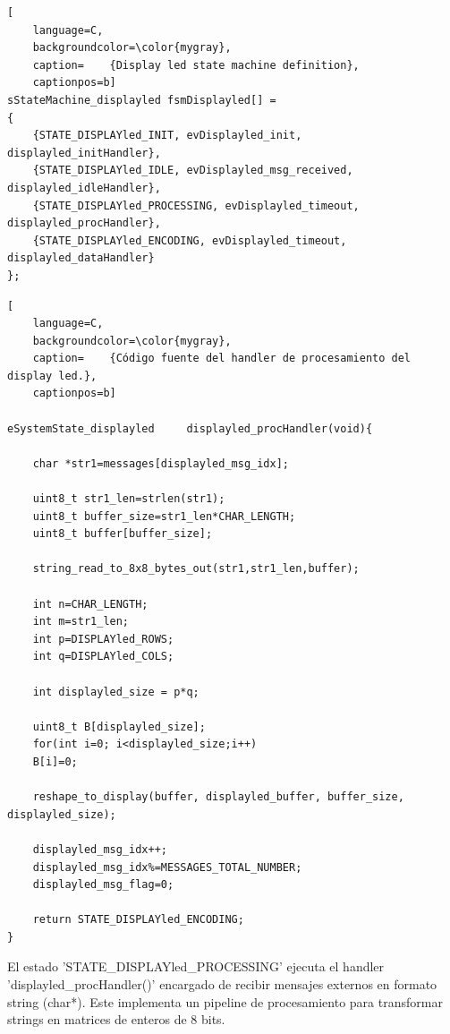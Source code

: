 \begin{lstlisting}[
	language=C, 
	backgroundcolor=\color{mygray},
	caption=	{Display led state machine definition},
	captionpos=b]
sStateMachine_displayled fsmDisplayled[] = 
{
    {STATE_DISPLAYled_INIT, evDisplayled_init, displayled_initHandler},
    {STATE_DISPLAYled_IDLE, evDisplayled_msg_received, displayled_idleHandler},
    {STATE_DISPLAYled_PROCESSING, evDisplayled_timeout, displayled_procHandler},
    {STATE_DISPLAYled_ENCODING, evDisplayled_timeout, displayled_dataHandler}
};
\end{lstlisting}
\label{code:fsmDisplay}



\begin{lstlisting}[
	language=C, 
	backgroundcolor=\color{mygray},
	caption=	{Código fuente del handler de procesamiento del display led.},
	captionpos=b]

eSystemState_displayled     displayled_procHandler(void){

    char *str1=messages[displayled_msg_idx];

    uint8_t str1_len=strlen(str1);
    uint8_t buffer_size=str1_len*CHAR_LENGTH;
    uint8_t buffer[buffer_size];

    string_read_to_8x8_bytes_out(str1,str1_len,buffer);

    int n=CHAR_LENGTH; 
    int m=str1_len;
    int p=DISPLAYled_ROWS;
    int q=DISPLAYled_COLS;

    int displayled_size = p*q;

    uint8_t B[displayled_size];
    for(int i=0; i<displayled_size;i++)
    B[i]=0;

    reshape_to_display(buffer, displayled_buffer, buffer_size, displayled_size);

    displayled_msg_idx++;
    displayled_msg_idx%=MESSAGES_TOTAL_NUMBER;
    displayled_msg_flag=0;

    return STATE_DISPLAYled_ENCODING;
}

\end{lstlisting}

El estado 'STATE\_DISPLAYled\_PROCESSING' ejecuta el handler  'displayled\_procHandler()' encargado de recibir mensajes externos en formato string (char*). Este implementa un pipeline de procesamiento para transformar strings en matrices de enteros de 8 bits.



